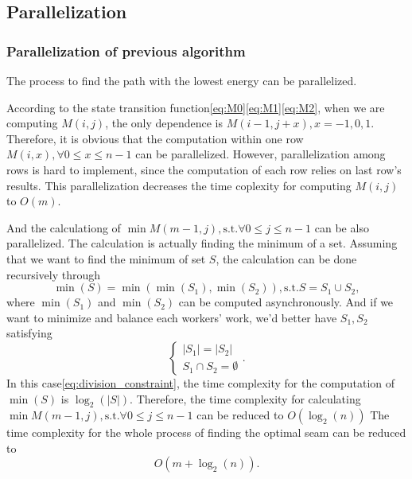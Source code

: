 \documentclass[final]{cvpr}
\begin{document}
\subsection{Parallelization}
\subsubsection{Parallelization of previous algorithm}
The process to find the path with the lowest energy can be parallelized.

According to the state transition function\ref{eq:M0}\ref{eq:M1}\ref{eq:M2}, when we are computing $M(i,j)$, the only dependence is $M(i-1,j+x),x=-1,0,1$.
Therefore, it is obvious that the computation within one row $M(i,x),\forall 0\le x\le n-1$ can be parallelized.
However, parallelization among rows is hard to implement, since the computation of each row relies on last row's results.
This parallelization decreases the time coplexity for computing $M(i,j)$ to $O(m)$.

And the calculationg of $\min M(m-1,j),\text{s.t.}\forall0\le j\le n-1$ can be also parallelized.
The calculation is actually finding the minimum of a set.
Assuming that we want to find the minimum of set $S$, the calculation can be done recursively through
\begin{equation}
    \min(S)=\min(\min(S_1),\min(S_2)),\text{s.t.}S=S_1\cup S_2,
    \label{eq:S_minimum}
\end{equation}
where $\min(S_1)$ and $\min(S_2)$ can be computed asynchronously.
And if we want to minimize and balance each workers' work, we'd better have $S_1,S_2$ satisfying
\begin{equation}
    \begin{cases}
        |S_1|=|S_2|\\
        S_1\cap S_2=\emptyset
    \end{cases}.
    \label{eq:division_constraint}
\end{equation}
In this case\ref{eq:division_constraint}, the time complexity for the computation of $\min(S)$ is $\log_2(|S|)$.
Therefore, the time complexity for calculating $\min M(m-1,j),\text{s.t.}\forall0\le j\le n-1$ can be reduced to $O(\log_2(n))$
The time complexity for the whole process of finding the optimal seam can be reduced to
\begin{equation}
    O(m+\log_2(n)).
    \label{eq:M_time_complexity}
\end{equation}
\end{document}
